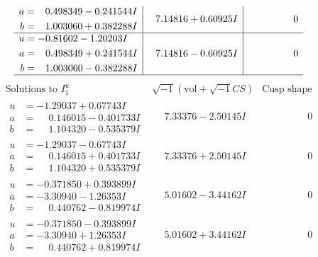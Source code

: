 \documentclass[1p]{elsarticle_modified}
\theoremstyle{definition}
\newcommand{\I}{\sqrt{-1}}
\begin{document}
$$\begin{array}{c|c|c}
\begin{aligned}
a &= \phantom{-}0.498349 - 0.241544 I \\
b &= \phantom{-}1.003060 + 0.382288 I\end{aligned}
 & \phantom{-}7.14816 + 0.60925 I & \phantom{-0.000000 } 0 \\ \hline\begin{aligned}
u &= -0.81602 - 1.20203 I \\
a &= \phantom{-}0.498349 + 0.241544 I \\
b &= \phantom{-}1.003060 - 0.382288 I\end{aligned}
 & \phantom{-}7.14816 - 0.60925 I & \phantom{-0.000000 } 0\\
 \hline 
 \end{array}$$\newpage$$\begin{array}{c|c|c}  
\text{Solutions to }I^u_{1}& \I (\text{vol} + \sqrt{-1}CS) & \text{Cusp shape}\\
 \hline 
\begin{aligned}
u &= -1.29037 + 0.67743 I \\
a &= \phantom{-}0.146015 - 0.401733 I \\
b &= \phantom{-}1.104320 - 0.535379 I\end{aligned}
 & \phantom{-}7.33376 - 2.50145 I & \phantom{-0.000000 } 0 \\ \hline\begin{aligned}
u &= -1.29037 - 0.67743 I \\
a &= \phantom{-}0.146015 + 0.401733 I \\
b &= \phantom{-}1.104320 + 0.535379 I\end{aligned}
 & \phantom{-}7.33376 + 2.50145 I & \phantom{-0.000000 } 0 \\ \hline\begin{aligned}
u &= -0.371850 + 0.393899 I \\
a &= -3.30940 - 1.26353 I \\
b &= \phantom{-}0.440762 - 0.819974 I\end{aligned}
 & \phantom{-}5.01602 - 3.44162 I & \phantom{-0.000000 } 0 \\ \hline\begin{aligned}
u &= -0.371850 - 0.393899 I \\
a &= -3.30940 + 1.26353 I \\
b &= \phantom{-}0.440762 + 0.819974 I\end{aligned}
 & \phantom{-}5.01602 + 3.44162 I & \phantom{-0.000000 } 0 \\ \hline\begin{aligned}

\end{aligned}
\end{array}$$
\end{document}

